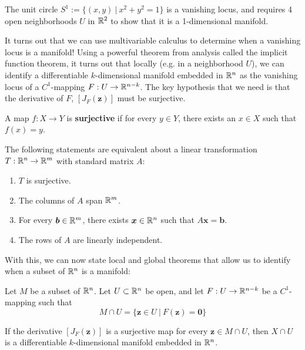     \begin{example}
        The unit circle $S^1 :=\{(x,y) \ | \ x^2 + y^2 = 1\}$ is a vanishing locus, and requires 4 open neighborhoods $U$ in $\mathbb{R}^2$ to show that it is a 1-dimensional manifold.
    \end{example}


    It turns out that we can use multivariable calculus to determine when a vanishing locus is a manifold!  Using a powerful theorem from analysis called the implicit function theorem, it turns out that locally (e.g. in a neighborhood $U$), we can identify a differentiable $k$-dimensional manifold embedded in $\mathbb{R}^n$ as the vanishing locus of a $C^1$-mapping $F : U \to \mathbb{R}^{n-k}$.  The key hypothesis that we need is that the derivative of $F$, $[J_F(\bm{z})]$ must be surjective.

    \begin{definition}
    A map $f : X \to Y$ is \textbf{surjective} if for every $y \in Y$, there exists an $x \in X$ such that $f(x) = y$.
    \end{definition}

    \begin{theorem}\label{surjectivity}
    The following statements are equivalent about a linear transformation $T : \mathbb{R}^n \to \mathbb{R}^m$ with standard matrix $A$:

    \begin{enumerate}
        \item $T$ is surjective.
        \item The columns of $A$ span $\mathbb{R}^m$.
        \item For every $\bm{b} \in \mathbb{R}^m$, there exists $\bm{x} \in \mathbb{R}^n$ such that $A\bm{x} = \bm{b}$.
        \item The rows of $A$ are linearly independent.
    \end{enumerate}
    \end{theorem}

    With this, we can now state local and global theorems that allow us to identify when a subset of $\mathbb{R}^n$ is a manifold:
    
    
    \begin{theorem} \label{implicitlocal}
     Let $M$ be a subset of $\mathbb{R}^n$. Let $U \subset \mathbb{R}^n$ be open, and let $F : U \to \mathbb{R}^{n-k}$ be a $C^1$-mapping such that
    $$M \cap U = \{\bm{z} \in U \ | \ F(\bm{z}) = \bm{0} \}$$
    
    If the derivative $[J_F(\bm{z})]$ is a surjective map for every $\bm{z} \in M \cap U$, then $X \cap U$ is a differentiable $k$-dimensional manifold embedded in $\mathbb{R}^n$.  
    \end{theorem}


